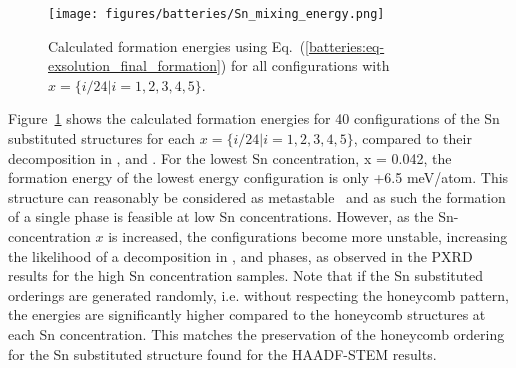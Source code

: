 \begin{refsection}
\begin{figure}[ht] 
\centering 
\captionsetup{width=0.9\linewidth}
\texttt{[image: figures/batteries/Sn\_mixing\_energy.png]} 
\caption{Calculated formation energies using 
Eq.~(\ref{batteries:eq-exsolution_final_formation}) for all configurations 
with $x = \{i/24|i=1,2,3,4,5\}$.} 
\label{batteries:fig-Sn_mixing} 
\end{figure} 
 
Figure~\ref{batteries:fig-Sn_mixing} shows the calculated formation energies 
for 40 configurations of the Sn substituted structures for each $x = 
\{i/24|i=1,2,3,4,5\}$, compared to their decomposition in 
,  and . For the lowest Sn 
concentration, x = 0.042, the formation energy of the lowest energy 
configuration is only +6.5 meV/atom. This structure can 
reasonably be considered as metastable~\cite{Sun2016} and as such the 
formation of a single phase is feasible at low Sn concentrations. However, as 
the Sn-concentration $x$ is increased, the  
configurations become more unstable, increasing the likelihood of a 
decomposition in ,  and  phases, as 
observed in the PXRD results for the high Sn concentration samples. Note that 
if the Sn substituted orderings are generated randomly, i.e. without 
respecting the honeycomb pattern, the energies are significantly higher 
compared to the honeycomb structures at each Sn concentration. This matches 
the preservation of the honeycomb ordering for the Sn substituted structure 
found for the HAADF-STEM results. 
 


\end{refsection}
